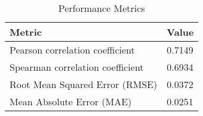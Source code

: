 \documentclass{article}
\begin{document}
\begin{table}[h!]
\centering
\begin{tabular}{ll}
\toprule
Metric & Value \\
\midrule
Pearson correlation coefficient & 0.7149 \\
Spearman correlation coefficient & 0.6934 \\
Root Mean Squared Error (RMSE) & 0.0372 \\
Mean Absolute Error (MAE) & 0.0251 \\
\bottomrule
\end{tabular}
\caption{Performance Metrics}
\label{tab:metrics}
\end{table}
\end{document}
